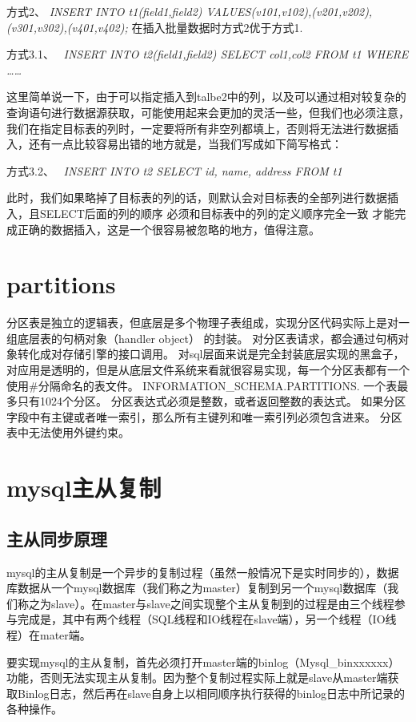 方式2、\textit{ INSERT INTO t1(field1,field2) VALUES(v101,v102),(v201,v202),(v301,v302),(v401,v402);}
在插入批量数据时方式2优于方式1.

方式3.1、  \textit{INSERT INTO t2(field1,field2) SELECT col1,col2 FROM t1 WHERE ……}

这里简单说一下，由于可以指定插入到talbe2中的列，以及可以通过相对较复杂的查询语句进行数据源获取，可能使用起来会更加的灵活一些，但我们也必须注意，我们在指定目标表的列时，一定要将所有非空列都填上，否则将无法进行数据插入，还有一点比较容易出错的地方就是，当我们写成如下简写格式：

方式3.2、  \textit{INSERT INTO t2 SELECT id, name, address FROM t1}

此时，我们如果略掉了目标表的列的话，则默认会对目标表的全部列进行数据插入，且SELECT后面的列的顺序 必须和目标表中的列的定义顺序完全一致 才能完成正确的数据插入，这是一个很容易被忽略的地方，值得注意。

\section{partitions}
分区表是独立的逻辑表，但底层是多个物理子表组成，实现分区代码实际上是对一组底层表的句柄对象（handler object） 的封装。
对分区表请求，都会通过句柄对象转化成对存储引擎的接口调用。
对sql层面来说是完全封装底层实现的黑盒子，对应用是透明的，但是从底层文件系统来看就很容易实现，每一个分区表都有一个使用\#分隔命名的表文件。
INFORMATION_SCHEMA.PARTITIONS. 一个表最多只有1024个分区。
分区表达式必须是整数，或者返回整数的表达式。
如果分区字段中有主键或者唯一索引，那么所有主键列和唯一索引列必须包含进来。
分区表中无法使用外键约束。



\section{mysql主从复制}

\subsection{主从同步原理}
mysql的主从复制是一个异步的复制过程（虽然一般情况下是实时同步的），数据库数据从一个mysql数据库（我们称之为master）复制到另一个mysql数据库（我们称之为slave）。在master与slave之间实现整个主从复制到的过程是由三个线程参与完成是，其中有两个线程（SQL线程和IO线程在slave端），另一个线程（IO线程）在mater端。

要实现mysql的主从复制，首先必须打开master端的binlog（Mysql_binxxxxxx）功能，否则无法实现主从复制。因为整个复制过程实际上就是slave从master端获取Binlog日志，然后再在slave自身上以相同顺序执行获得的binlog日志中所记录的各种操作。

